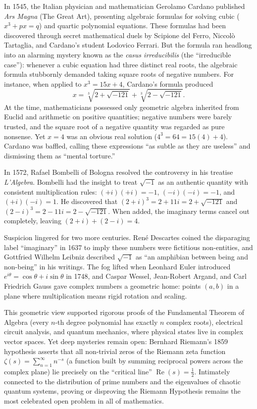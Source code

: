 \begin{historybox}
In 1545, the Italian physician and mathematician Gerolamo Cardano published \emph{Ars Magna} (The Great Art), presenting algebraic formulas for solving cubic ($x^3 + px = q$) and quartic polynomial equations. These formulas had been discovered through secret mathematical duels by Scipione del Ferro, Niccol\`o Tartaglia, and Cardano's student Lodovico Ferrari. But the formula ran headlong into an alarming mystery known as the \emph{casus irreducibilis} (the ``irreducible case''): whenever a cubic equation had three distinct real roots, the algebraic formula stubbornly demanded taking square roots of negative numbers. For instance, when applied to $x^3 = 15x + 4$, Cardano's formula produced
\[
  x = \sqrt[3]{2 + \sqrt{-121}} + \sqrt[3]{2 - \sqrt{-121}}.
\]
At the time, mathematicians possessed only geometric algebra inherited from Euclid and arithmetic on positive quantities; negative numbers were barely trusted, and the square root of a negative quantity was regarded as pure nonsense. Yet $x = 4$ was an obvious real solution ($4^3 = 64 = 15(4) + 4$). Cardano was baffled, calling these expressions ``as subtle as they are useless'' and dismissing them as ``mental torture.''

In 1572, Rafael Bombelli of Bologna resolved the controversy in his treatise \emph{L'Algebra}. Bombelli had the insight to treat $\sqrt{-1}$ as an authentic quantity with consistent multiplication rules: $(+i)(+i) = -1$, $(-i)(-i) = -1$, and $(+i)(-i) = 1$. He discovered that $(2 + i)^3 = 2 + 11i = 2 + \sqrt{-121}$ and $(2 - i)^3 = 2 - 11i = 2 - \sqrt{-121}$. When added, the imaginary terms cancel out completely, leaving $(2+i) + (2-i) = 4$.

Suspicion lingered for two more centuries. Ren\'e Descartes coined the disparaging label ``imaginary'' in 1637 to imply these numbers were fictitious non-entities, and Gottfried Wilhelm Leibniz described $\sqrt{-1}$ as ``an amphibian between being and non-being'' in his writings. The fog lifted when Leonhard Euler introduced $e^{i\theta} = \cos\theta + i\sin\theta$ in 1748, and Caspar Wessel, Jean-Robert Argand, and Carl Friedrich Gauss gave complex numbers a geometric home: points $(a,b)$ in a plane where multiplication means rigid rotation and scaling.

This geometric view supported rigorous proofs of the Fundamental Theorem of Algebra (every $n$-th degree polynomial has exactly $n$ complex roots), electrical circuit analysis, and quantum mechanics, where physical states live in complex vector spaces. Yet deep mysteries remain open: Bernhard Riemann's 1859 hypothesis asserts that all non-trivial zeros of the Riemann zeta function $\zeta(s) = \sum_{n=1}^\infty n^{-s}$ (a function built by summing reciprocal powers across the complex plane) lie precisely on the ``critical line'' $\operatorname{Re}(s) = \tfrac12$. Intimately connected to the distribution of prime numbers and the eigenvalues of chaotic quantum systems, proving or disproving the Riemann Hypothesis remains the most celebrated open problem in all of mathematics.
\end{historybox}

